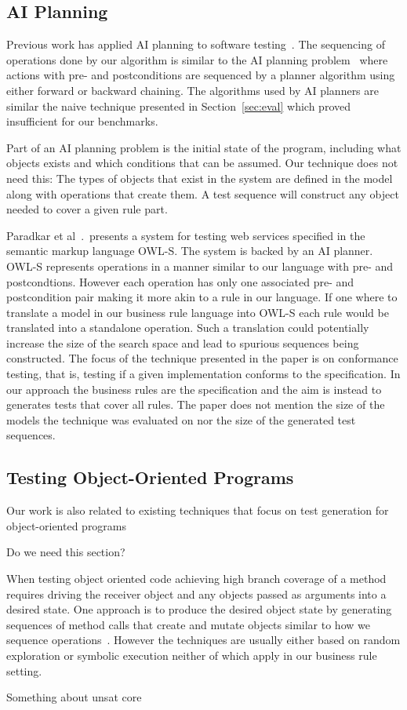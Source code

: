 \subsection{AI Planning}

Previous work has applied AI planning to software
testing~\cite{Scheetz99ai,Howe97testcase}. The sequencing of
operations done by our algorithm is similar to the AI planning
problem~\cite{Weld94} where actions with pre- and postconditions are sequenced
by a planner algorithm using either forward or backward chaining. The
algorithms used by AI planners are similar the naive technique
presented in Section~\ref{sec:eval} which proved insufficient for our
benchmarks. 

Part of an AI planning problem is the initial state of the program,
including what objects exists and which conditions that can be
assumed. Our technique does not need this: The types of objects that
exist in the system are defined in the model along with operations
that create them. A test sequence will construct any object needed to
cover a given rule part.

Paradkar et al~\cite{conf/icws/ParadkarSWJOSL07}.\ presents a system
for testing web services specified in the semantic markup language
OWL-S. The system is backed by an AI planner. OWL-S represents
operations in a manner similar to our language with pre- and
postcondtions. However each operation has only one associated pre- and
postcondition pair making it more akin to a rule in our language. If
one where to translate a model in our business rule language into
OWL-S each rule would be translated into a standalone operation. Such
a translation could potentially increase the size of the search space
and lead to spurious sequences being constructed. The focus of the
technique presented in the paper is on conformance testing, that is,
testing if a given implementation conforms to the specification. In
our approach the business rules are the specification and the aim is
instead to generates tests that cover all rules. The paper does not
mention the size of the models the technique was evaluated on nor the
size of the generated test sequences.

\subsection{Testing Object-Oriented Programs}

Our work is also related to existing techniques that focus on test 
generation for object-oriented programs~\cite{pacheco2007,tillmann2008,thummalapenta2011, xie:symstra,
csallner:jcrasher, phil:evo, tonella:etoc}

Do we need this section?

When testing object oriented code achieving high branch coverage of a
method requires driving the receiver object and any objects passed as
arguments into a desired state. One approach is to produce the desired
object state by generating sequences of method calls that create and
mutate objects similar to how we sequence
operations~\cite{pacheco2007,tillmann2008,thummalapenta2011}. However
the techniques are usually either based on random exploration or
symbolic execution neither of which apply in our business rule setting.

Something about unsat core
